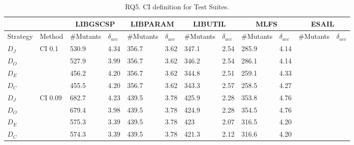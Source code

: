 

\begin{table*}[h]
\centering
\scriptsize
\caption{RQ5. CI definition for \APPR Test Suites.}
\label{table:results:ciDefinition} 
\begin{tabular}{|l|l|llllllllll|}
\hline
          &                           & \multicolumn{2}{c}{LIBGSCSP} & \multicolumn{2}{c}{LIBPARAM} & \multicolumn{2}{c}{LIBUTIL} & \multicolumn{2}{c}{MLFS} & \multicolumn{2}{c|}{ESAIL} \\
\hline
Strategy  & Method                    & \#Mutants    & \textbf{$\delta_{acc}$}    & \#Mutants    & \textbf{$\delta_{acc}$}    & \#Mutants    & \textbf{$\delta_{acc}$}   & \#Mutants  & \textbf{$\delta_{acc}$}  & \#Mutants   & \textbf{$\delta_{acc}$}  \\
\hline
$D_J$   & \multirow{4}{*}{CI 0.1}  & 530.9        & 4.34          & 356.7        & 3.62          & 347.1        & 2.54         & 285.9      & 4.14        &             &             \\
$D_O$    &                           & 527.9        & 3.99          & 356.7        & 3.62          & 346.2        & 2.54         & 286.1      & 4.14        &             &             \\
$D_E$ &                           & 456.2        & 4.20          & 356.7        & 3.62          & 344.8        & 2.51         & 259.1      & 4.33        &             &             \\
$D_C$    &                           & 455.5        & 4.20          & 356.7        & 3.62          & 343.3        & 2.57         & 258.5      & 4.27        &             &             \\
\hline
$D_J$   & \multirow{4}{*}{CI 0.09} & 682.7        & 4.23          & 439.5        & 3.78          & 425.9        & 2.28         & 353.8      & 4.76        &             &             \\
$D_O$    &                           & 679.4        & 3.98          & 439.5        & 3.78          & 424.9        & 2.28         & 354.5      & 4.76        &             &             \\
$D_E$ &                           & 575.3        & 3.39          & 439.5        & 3.78          & 423          & 2.07         & 316.5      & 4.20        &             &             \\
$D_C$    &                           & 574.3        & 3.39          & 439.5        & 3.78          & 421.3        & 2.12         & 316.6      & 4.20        &             &             \\

\end{tabular}
\end{table*}
